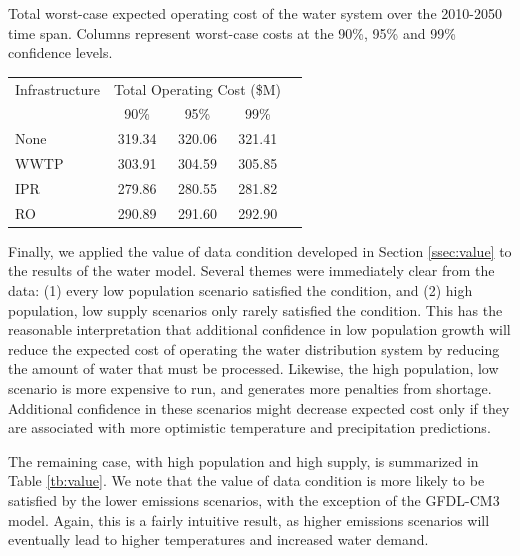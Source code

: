 \documentclass[opre,nonblindrev]{informs3} %
\begin{document}
\begin{table}
	\TABLE
	{
		Total worst-case expected operating cost of the water system over the 2010-2050 time span.
		Columns represent worst-case costs at the 90\%, 95\% and 99\% confidence levels.
		\label{tb:total_cost}
	}
	{\begin{tabular}{l|cccc}
		Infrastructure & \multicolumn{3}{c}{Total Operating Cost (\$M)} \\
		     & 90\%   & 95\%   & 99\% \\
		\hline
		None & 319.34 & 320.06 & 321.41 \\
		WWTP & 303.91 & 304.59 & 305.85 \\
		IPR  & 279.86 & 280.55 & 281.82 \\
		RO   & 290.89 & 291.60 & 292.90
	 \end{tabular}}
	{}
\end{table}

Finally, we applied the value of data condition developed in Section \ref{ssec:value} to the results of the water model.
Several themes were immediately clear from the data: (1) every low population scenario satisfied the condition, and (2) high population, low supply scenarios only rarely satisfied the condition.
This has the reasonable interpretation that additional confidence in low population growth will reduce the expected cost of operating the water distribution system by reducing the amount of water that must be processed.
Likewise, the high population, low scenario is more expensive to run, and generates more penalties from shortage.
Additional confidence in these scenarios might decrease expected cost only if they are associated with more optimistic temperature and precipitation predictions.

The remaining case, with high population and high supply, is summarized in Table \ref{tb:value}.
We note that the value of data condition is more likely to be satisfied by the lower emissions scenarios, with the exception of the GFDL-CM3 model.
Again, this is a fairly intuitive result, as higher emissions scenarios will eventually lead to higher temperatures and increased water demand.
\end{document}
